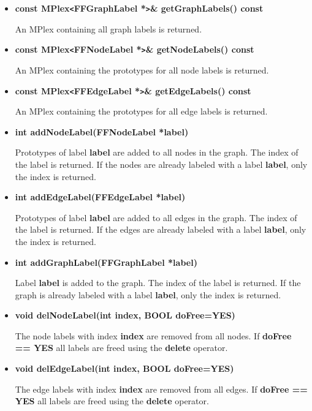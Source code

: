 \begin{itemize}
  The graph label with index {\bf index} is returned or {\bf
    NULL} if the graph has no graph label with index {\bf index}.
  
\item{\bf const MPlex\verb|<|FFGraphLabel *\verb|>|\&
    getGraphLabels() const}

An MPlex containing all graph labels is returned.

\item{\bf const MPlex\verb|<|FFNodeLabel *\verb|>|\&
    getNodeLabels() const}

An MPlex containing the prototypes for all node labels is returned.

\item{\bf const MPlex\verb|<|FFEdgeLabel *\verb|>|\&
    getEdgeLabels() const}

An MPlex containing the prototypes for all edge labels is returned.

\item{\bf int addNodeLabel(FFNodeLabel *label)}
  
  Prototypes of label {\bf label} are added to all nodes in the
  graph. The index of the label is returned. If the nodes are
  already labeled with a label {\bf label}, only the index is
  returned.

\item{\bf int addEdgeLabel(FFEdgeLabel *label)}
  
  Prototypes of label {\bf label} are added to all edges in the
  graph. The index of the label is returned. If the edges are
  already labeled with a label {\bf label}, only the index is
  returned.

\item{\bf int addGraphLabel(FFGraphLabel *label)}

Label {\bf label} is added to  the graph. The index of
the label is returned. If the graph is already labeled with a 
label {\bf label}, only the index is returned.

\item{\bf void delNodeLabel(int index, BOOL doFree=YES)}

The node labels with index {\bf index} are removed from all nodes. 
If {\bf doFree == YES} all labels are freed using the {\bf delete} 
operator.

\item{\bf void delEdgeLabel(int index, BOOL doFree=YES)}

The edge labels with index {\bf index} are removed from all edges. 
If {\bf doFree == YES} all labels are freed using the {\bf delete}
operator.


\end{itemize}
